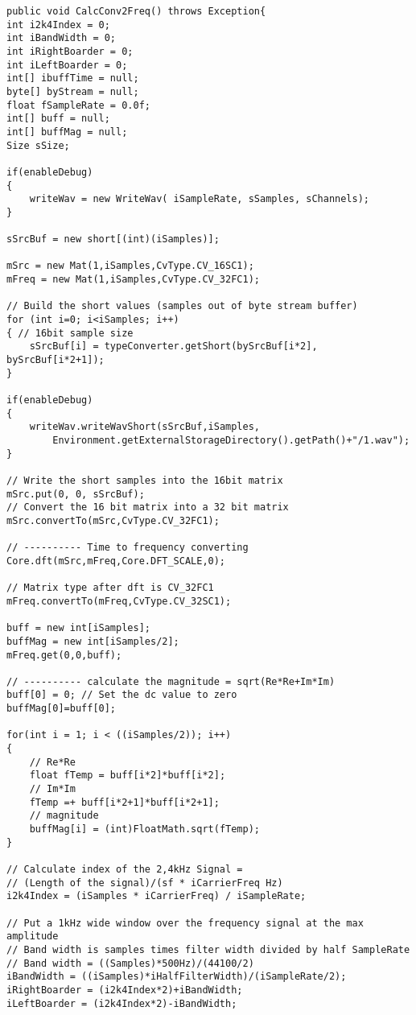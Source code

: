 \documentclass[10pt]{scrartcl}
\begin{document}
\begin{lstlisting}
public void CalcConv2Freq() throws Exception{
int i2k4Index = 0;
int iBandWidth = 0;
int iRightBoarder = 0;
int iLeftBoarder = 0;
int[] ibuffTime = null;
byte[] byStream = null;
float fSampleRate = 0.0f;
int[] buff = null;
int[] buffMag = null;
Size sSize;
		
if(enableDebug)
{
	writeWav = new WriteWav( iSampleRate, sSamples, sChannels);
}
				
sSrcBuf = new short[(int)(iSamples)];      		
		
mSrc = new Mat(1,iSamples,CvType.CV_16SC1);    
mFreq = new Mat(1,iSamples,CvType.CV_32FC1);   
							
// Build the short values (samples out of byte stream buffer)
for (int i=0; i<iSamples; i++)
{ // 16bit sample size
	sSrcBuf[i] = typeConverter.getShort(bySrcBuf[i*2], bySrcBuf[i*2+1]);
}
		
if(enableDebug)
{		
	writeWav.writeWavShort(sSrcBuf,iSamples,
		Environment.getExternalStorageDirectory().getPath()+"/1.wav");
}
				
// Write the short samples into the 16bit matrix
mSrc.put(0, 0, sSrcBuf);
// Convert the 16 bit matrix into a 32 bit matrix 
mSrc.convertTo(mSrc,CvType.CV_32FC1);
		
// ---------- Time to frequency converting 
Core.dft(mSrc,mFreq,Core.DFT_SCALE,0);

// Matrix type after dft is CV_32FC1 
mFreq.convertTo(mFreq,CvType.CV_32SC1);

buff = new int[iSamples];
buffMag = new int[iSamples/2];
mFreq.get(0,0,buff);

// ---------- calculate the magnitude = sqrt(Re*Re+Im*Im)
buff[0] = 0; // Set the dc value to zero
buffMag[0]=buff[0];
		
for(int i = 1; i < ((iSamples/2)); i++)
{
	// Re*Re
	float fTemp = buff[i*2]*buff[i*2];
	// Im*Im
	fTemp =+ buff[i*2+1]*buff[i*2+1];
	// magnitude 
	buffMag[i] = (int)FloatMath.sqrt(fTemp);
}
		
// Calculate index of the 2,4kHz Signal =
// (Length of the signal)/(sf * iCarrierFreq Hz) 
i2k4Index = (iSamples * iCarrierFreq) / iSampleRate;
					
// Put a 1kHz wide window over the frequency signal at the max amplitude 
// Band width is samples times filter width divided by half SampleRate 
// Band width = ((Samples)*500Hz)/(44100/2)
iBandWidth = ((iSamples)*iHalfFilterWidth)/(iSampleRate/2);
iRightBoarder = (i2k4Index*2)+iBandWidth;
iLeftBoarder = (i2k4Index*2)-iBandWidth;
		

\end{lstlisting}
\end{document}
